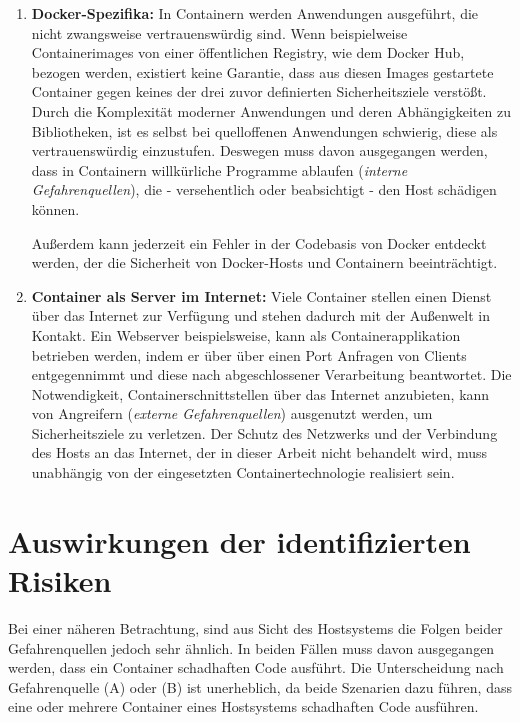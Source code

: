 \documentclass[../main.tex]{subfiles}
\begin{document}
    \begin{enumerate}[label=(\Alph*)]
      \item \textbf{Docker-Spezifika:} In Containern werden Anwendungen ausgeführt, die nicht zwangsweise vertrauenswürdig sind. Wenn beispielweise Containerimages von einer öffentlichen Registry, wie dem Docker Hub, bezogen werden, existiert keine Garantie, dass aus diesen Images gestartete Container gegen keines der drei zuvor definierten Sicherheitsziele verstößt. Durch die Komplexität moderner Anwendungen und deren Abhängigkeiten zu Bibliotheken, ist es selbst bei quelloffenen Anwendungen schwierig, diese als vertrauenswürdig einzustufen. Deswegen muss davon ausgegangen werden, dass in Containern willkürliche Programme ablaufen (\emph{interne Gefahrenquellen}), die - versehentlich oder beabsichtigt - den Host schädigen können.

      Außerdem kann jederzeit ein Fehler in der Codebasis von Docker entdeckt werden, der die Sicherheit von Docker-Hosts und Containern beeinträchtigt.

      \item \textbf{Container als Server im Internet:} Viele Container stellen einen Dienst über das Internet zur Verfügung und stehen dadurch mit der Außenwelt in Kontakt. Ein Webserver beispielsweise, kann als Containerapplikation betrieben werden, indem er über über einen Port Anfragen von Clients entgegennimmt und diese nach abgeschlossener Verarbeitung beantwortet. Die Notwendigkeit, Containerschnittstellen über das Internet anzubieten, kann von Angreifern (\emph{externe Gefahrenquellen}) ausgenutzt werden, um Sicherheitsziele zu verletzen. Der Schutz des Netzwerks und der Verbindung des Hosts an das Internet, der in dieser Arbeit nicht behandelt wird, muss unabhängig von der eingesetzten Containertechnologie realisiert sein.
    \end{enumerate}

  \section{Auswirkungen der identifizierten Risiken}
  \label{questionEffects}
    Bei einer näheren Betrachtung, sind aus Sicht des Hostsystems die Folgen beider Gefahrenquellen jedoch sehr ähnlich. In beiden Fällen muss davon ausgegangen werden, dass ein Container schadhaften Code ausführt. Die Unterscheidung nach Gefahrenquelle (A) oder (B) ist unerheblich, da beide Szenarien dazu führen, dass eine oder mehrere Container eines Hostsystems schadhaften Code ausführen.
\end{document}
